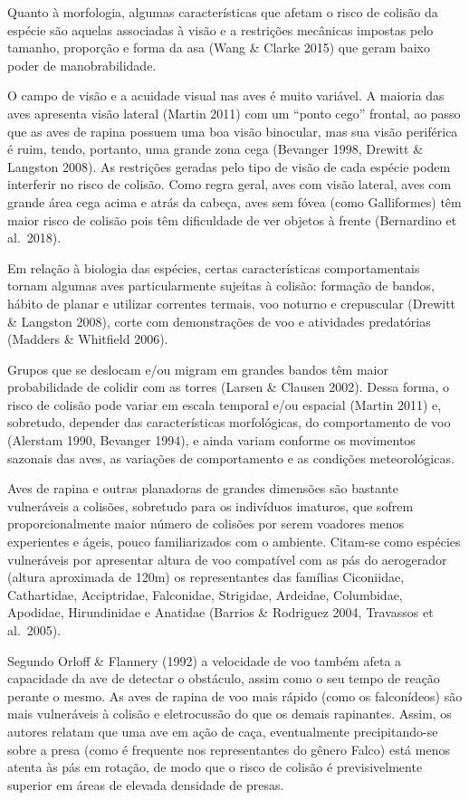 \documentclass[
  oneside]{scrbook}
\begin{document}
Quanto à morfologia, algumas características que afetam o risco de colisão da espécie são aquelas associadas à visão e a restrições mecânicas impostas pelo tamanho, proporção e forma da asa (Wang \& Clarke 2015) que geram baixo poder de manobrabilidade.

O campo de visão e a acuidade visual nas aves é muito variável. A maioria das aves apresenta visão lateral (Martin 2011) com um ``ponto cego'' frontal, ao passo que as aves de rapina possuem uma boa visão binocular, mas sua visão periférica é ruim, tendo, portanto, uma grande zona cega (Bevanger 1998, Drewitt \& Langston 2008). As restrições geradas pelo tipo de visão de cada espécie podem interferir no risco de colisão. Como regra geral, aves com visão lateral, aves com grande área cega acima e atrás da cabeça, aves sem fóvea (como Galliformes) têm maior risco de colisão pois têm dificuldade de ver objetos à frente (Bernardino et al.~2018).

Em relação à biologia das espécies, certas características comportamentais tornam algumas aves particularmente sujeitas à colisão: formação de bandos, hábito de planar e utilizar correntes termais, voo noturno e crepuscular (Drewitt \& Langston 2008), corte com demonstrações de voo e atividades predatórias (Madders \& Whitfield 2006).

Grupos que se deslocam e/ou migram em grandes bandos têm maior probabilidade de colidir com as torres (Larsen \& Clausen 2002). Dessa forma, o risco de colisão pode variar em escala temporal e/ou espacial (Martin 2011) e, sobretudo, depender das características morfológicas, do comportamento de voo (Alerstam 1990, Bevanger 1994), e ainda variam conforme os movimentos sazonais das aves, as variações de comportamento e as condições meteorológicas.

Aves de rapina e outras planadoras de grandes dimensões são bastante vulneráveis a colisões, sobretudo para os indivíduos imaturos, que sofrem proporcionalmente maior número de colisões por serem voadores menos experientes e ágeis, pouco familiarizados com o ambiente. Citam-se como espécies vulneráveis por apresentar altura de voo compatível com as pás do aerogerador (altura aproximada de 120m) os representantes das famílias Ciconiidae, Cathartidae, Acciptridae, Falconidae, Strigidae, Ardeidae, Columbidae, Apodidae, Hirundinidae e Anatidae (Barrios \& Rodriguez 2004, Travassos et al.~2005).

Segundo Orloff \& Flannery (1992) a velocidade de voo também afeta a capacidade da ave de detectar o obstáculo, assim como o seu tempo de reação perante o mesmo. As aves de rapina de voo mais rápido (como os falconídeos) são mais vulneráveis à colisão e eletrocussão do que os demais rapinantes. Assim, os autores relatam que uma ave em ação de caça, eventualmente precipitando-se sobre a presa (como é frequente nos representantes do gênero Falco) está menos atenta às pás em rotação, de modo que o risco de colisão é previsivelmente superior em áreas de elevada densidade de presas.
\end{document}
